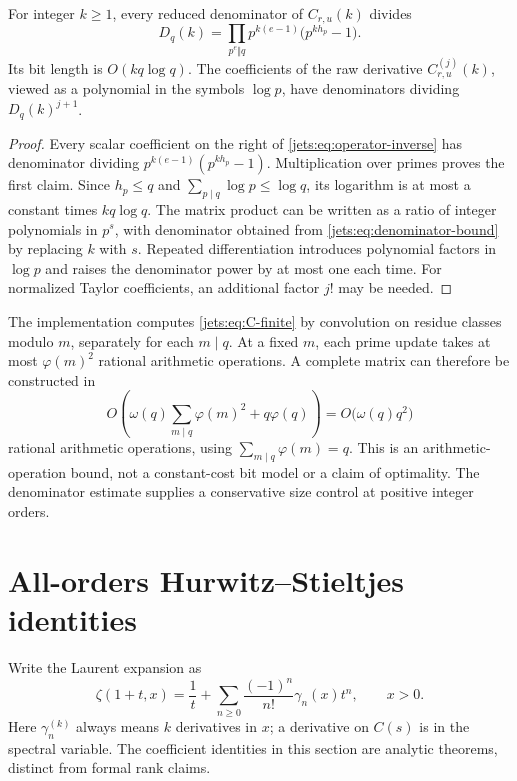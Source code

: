\begin{proposition}\label{jets:prop:denominator}
For integer $k\ge1$, every reduced denominator of $C_{r,u}(k)$ divides
\begin{equation}\label{jets:eq:denominator-bound}
 D_q(k)=\prod_{p^e\Vert q}
 p^{k(e-1)}\bigl(p^{kh_p}-1\bigr).
\end{equation}
Its bit length is $O(kq\log q)$. The coefficients of the raw derivative
$C_{r,u}^{(j)}(k)$, viewed as a polynomial in the symbols $\log p$,
have denominators dividing $D_q(k)^{j+1}$.
\end{proposition}
\begin{proof}
Every scalar coefficient on the right of
\eqref{jets:eq:operator-inverse} has denominator dividing
$p^{k(e-1)}(p^{kh_p}-1)$. Multiplication over primes proves the first
claim. Since $h_p\le q$ and $\sum_{p\mid q}\log p\le\log q$, its
logarithm is at most a constant times $kq\log q$.
The matrix product can be written as a ratio of integer polynomials in
$p^s$, with denominator obtained from \eqref{jets:eq:denominator-bound} by
replacing $k$ with $s$. Repeated differentiation introduces polynomial
factors in $\log p$ and raises the denominator power by at most one
each time. For normalized Taylor coefficients, an additional factor
$j!$ may be needed.
\end{proof}

The implementation computes \eqref{jets:eq:C-finite} by convolution on
residue classes modulo $m$, separately for each $m\mid q$. At a fixed
$m$, each prime update takes at most $\varphi(m)^2$ rational arithmetic
operations. A complete matrix can therefore be constructed in
\[
 O\!\left(\omega(q)\sum_{m\mid q}\varphi(m)^2+q\varphi(q)\right)
 =O\bigl(\omega(q)q^2\bigr)
\]
rational arithmetic operations, using $\sum_{m\mid q}\varphi(m)=q$.
This is an arithmetic-operation bound, not a constant-cost bit model
or a claim of optimality. The denominator estimate supplies a
conservative size control at positive integer orders.

\section{All-orders Hurwitz--Stieltjes identities}\label{jets:sec:stieltjes}

Write the Laurent expansion as
\begin{equation}\label{jets:eq:stieltjes-laurent}
 \zeta(1+t,x)=\frac1t+
 \sum_{n\ge0}\frac{(-1)^n}{n!}\gamma_n(x)t^n,
 \qquad x>0.
\end{equation}
Here $\gamma_n^{(k)}$ always means $k$ derivatives in $x$; a derivative
on $C(s)$ is in the spectral variable. The coefficient identities in
this section are analytic theorems, distinct from formal rank claims.

